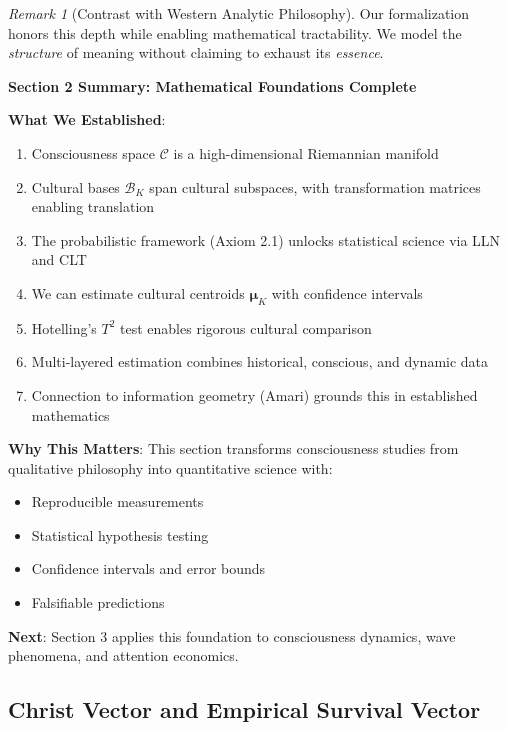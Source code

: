 \documentclass[11pt,a4paper]{article}
\theoremstyle{definition}
\theoremstyle{remark}
\newtheorem{remark}{Remark}[section]
\newcommand{\CC}{\mathcal{C}}
\begin{document}
\begin{small}
\begin{remark}[Contrast with Western Analytic Philosophy]
Our formalization honors this depth while enabling mathematical tractability. We model the \textit{structure} of meaning without claiming to exhaust its \textit{essence}.
\end{remark}

\begin{mdframed}[backgroundcolor=green!10,linewidth=2pt,linecolor=green!70!black]
\textbf{Section 2 Summary: Mathematical Foundations Complete}

\textbf{What We Established}:
\begin{enumerate}[nosep]
    \item Consciousness space \(\CC\) is a high-dimensional Riemannian manifold
    \item Cultural bases \(\mathcal{B}_K\) span cultural subspaces, with transformation matrices enabling translation
    \item The probabilistic framework (Axiom 2.1) unlocks statistical science via LLN and CLT
    \item We can estimate cultural centroids \(\boldsymbol{\mu}_K\) with confidence intervals
    \item Hotelling's \(T^2\) test enables rigorous cultural comparison
    \item Multi-layered estimation combines historical, conscious, and dynamic data
    \item Connection to information geometry (Amari) grounds this in established mathematics
\end{enumerate}

\textbf{Why This Matters}:
This section transforms consciousness studies from qualitative philosophy into quantitative science with:
\begin{itemize}[nosep]
    \item Reproducible measurements
    \item Statistical hypothesis testing  
    \item Confidence intervals and error bounds
    \item Falsifiable predictions
\end{itemize}

\textbf{Next}: Section 3 applies this foundation to consciousness dynamics, wave phenomena, and attention economics.
\end{mdframed}


\subsection{Christ Vector and Empirical Survival Vector}


\end{small}
\end{document}
